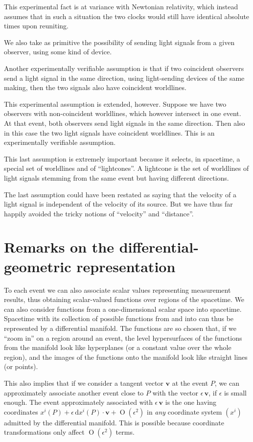 \documentclass[\ifafour a4paper,12pt,\else a5paper,10pt,\fi%
onecolumn,oneside,article,%
british%
]{memoir}
\theoremstyle{remark}
\theoremstyle{innote}
\newcommand*{\di}{\mathrm{d}}%
\DeclareMathOperator{\Ord}{O}%
\renewcommand*{\|}[1][]{\nonscript\:#1\vert\nonscript\:\mathopen{}}
\newcommand*{\yv}{\bm{v}}
\begin{document}
This experimental fact is at variance with Newtonian relativity, which instead assumes that in such a situation the two clocks would still have identical absolute times upon reuniting.

We also take as primitive the possibility of sending light signals from a given observer, using some kind of device.

Another experimentally verifiable assumption is that if two coincident observers send a light signal in the same direction, using light-sending devices of the same making, then the two signals also have coincident worldlines.

This experimental assumption is extended, however. Suppose we have two observers with non-coincident worldlines, which however intersect in one event. At that event, both observers send light signals in the same direction. Then also in this case the two light signals have coincident worldlines. This is an experimentally verifiable assumption.

This last assumption is extremely important because it selects, in spacetime, a special set of worldlines and of \enquote{lightcones}. A lightcone is the set of worldlines of light signals stemming from the same event but having different directions.

The last assumption could have been restated as saying that the velocity of a light signal is independent of the velocity of its source. But we have thus far happily avoided the tricky notions of \enquote{velocity} and \enquote{distance}.


\section{Remarks on the differential-geometric representation}
\label{sec:diff_geo_intro}

To each event we can also associate scalar values representing measurement results, thus obtaining scalar-valued functions over regions of the spacetime. We can also consider functions from a one-dimensional scalar space into spacetime. Spacetime with its collection of possible functions from and into can thus be represented by a differential manifold. The functions are so chosen that, if we \enquote{zoom in} on a region around an event, the level hypersurfaces of the functions from the manifold look like hyperplanes (or a constant value over the whole region), and the images of the functions onto the manifold look like straight lines (or points).

This also implies that if we consider a tangent vector $\yv$ at the event $P$, we can approximately associate another event close to $P$ with the vector $\epsilon\,\yv$, if $\epsilon$ is small enough. The event approximately associated with $\epsilon\,\yv$ is the one having coordinates $x^{i}(P) + \epsilon\,\di x^{i}(P)\cdot\yv + \Ord(\epsilon^{2})$ in \emph{any} coordinate system $(x^{i})$ admitted by the differential manifold. This is possible because coordinate transformations only affect $\Ord(\epsilon^{2})$ terms.
\end{document}
